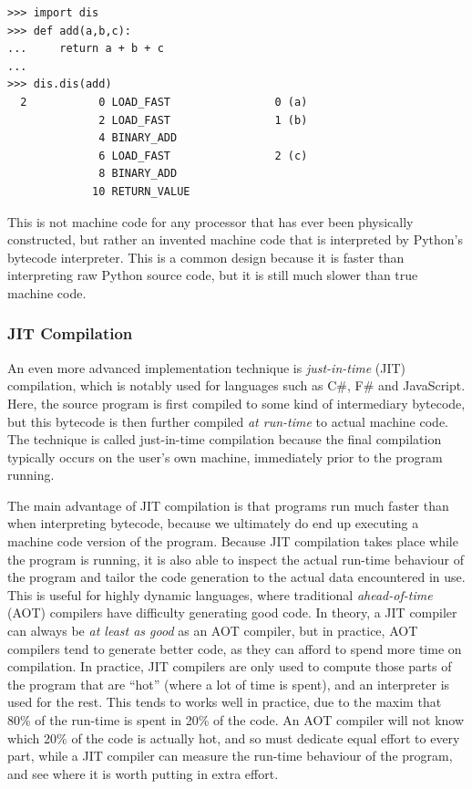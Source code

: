 \begin{lstlisting}
>>> import dis
>>> def add(a,b,c):
...     return a + b + c
...
>>> dis.dis(add)
  2           0 LOAD_FAST                0 (a)
              2 LOAD_FAST                1 (b)
              4 BINARY_ADD
              6 LOAD_FAST                2 (c)
              8 BINARY_ADD
             10 RETURN_VALUE
\end{lstlisting}

This is not machine code for any processor that has ever been
physically constructed, but rather an invented machine code that is
interpreted by Python's bytecode interpreter.  This is a common design
because it is faster than interpreting raw Python source code, but it
is still much slower than true machine code.

\subsubsection{JIT Compilation}

An even more advanced implementation technique is
\textit{just-in-time} (JIT) compilation, which is notably used for
languages such as C\#, F\# and JavaScript.  Here, the source program
is first compiled to some kind of intermediary bytecode, but this
bytecode is then further compiled \textit{at run-time} to actual
machine code.  The technique is called just-in-time compilation
because the final compilation typically occurs on the user's own
machine, immediately prior to the program running.

The main advantage of JIT compilation is that programs run much faster
than when interpreting bytecode, because we ultimately do end up
executing a machine code version of the program.  Because JIT
compilation takes place while the program is running, it is also able
to inspect the actual run-time behaviour of the program and tailor the
code generation to the actual data encountered in use.  This is useful
for highly dynamic languages, where traditional \textit{ahead-of-time}
(AOT) compilers have difficulty generating good code.  In theory, a
JIT compiler can always be \textit{at least as good} as an AOT
compiler, but in practice, AOT compilers tend to generate better code,
as they can afford to spend more time on compilation.  In practice,
JIT compilers are only used to compute those parts of the program that
are ``hot'' (where a lot of time is spent), and an interpreter is used
for the rest.  This tends to works well in practice, due to the maxim
that 80\% of the run-time is spent in 20\% of the code.  An AOT
compiler will not know which 20\% of the code is actually hot, and so
must dedicate equal effort to every part, while a JIT compiler can
measure the run-time behaviour of the program, and see where it is
worth putting in extra effort.

